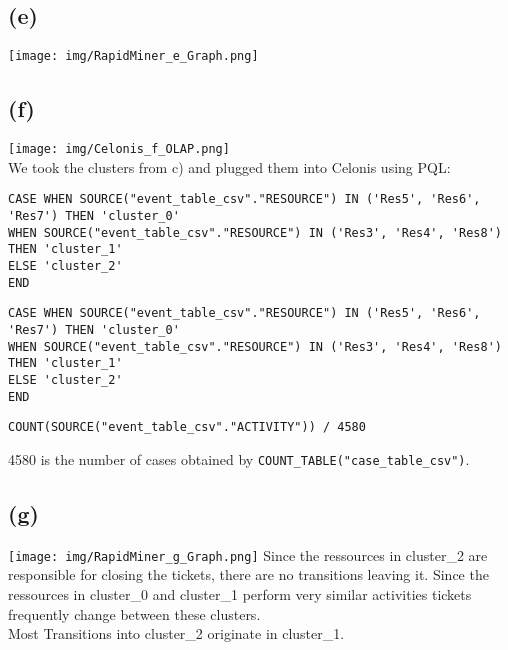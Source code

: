 \documentclass[../../main.tex]{subfiles}
\begin{document}
\subsection*{(e)}

\texttt{[image: img/RapidMiner\_e\_Graph.png]}

\subsection*{(f)}
\texttt{[image: img/Celonis\_f\_OLAP.png]}\\
We took the clusters from c) and plugged them into Celonis using PQL:
\begin{lstlisting}
CASE WHEN SOURCE("event_table_csv"."RESOURCE") IN ('Res5', 'Res6', 'Res7') THEN 'cluster_0'
WHEN SOURCE("event_table_csv"."RESOURCE") IN ('Res3', 'Res4', 'Res8') THEN 'cluster_1'
ELSE 'cluster_2'
END
\end{lstlisting}
\begin{lstlisting}
CASE WHEN SOURCE("event_table_csv"."RESOURCE") IN ('Res5', 'Res6', 'Res7') THEN 'cluster_0'
WHEN SOURCE("event_table_csv"."RESOURCE") IN ('Res3', 'Res4', 'Res8') THEN 'cluster_1'
ELSE 'cluster_2'
END
\end{lstlisting}
\begin{lstlisting}
COUNT(SOURCE("event_table_csv"."ACTIVITY")) / 4580
\end{lstlisting}
4580 is the number of cases obtained by \verb|COUNT_TABLE("case_table_csv")|.

\subsection*{(g)}
\texttt{[image: img/RapidMiner\_g\_Graph.png]}
Since the ressources in cluster\_2 are responsible for closing the tickets, there are no transitions leaving it. Since the ressources in cluster\_0 and cluster\_1 perform very similar activities tickets frequently change between these clusters.\\
Most Transitions into cluster\_2 originate in cluster\_1.
\end{document}
